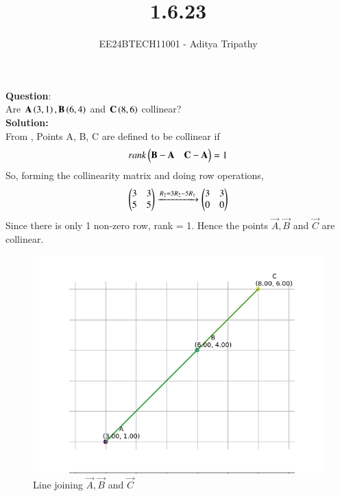 \documentclass[journal]{IEEEtran}
\begin{document}

\vspace{3cm}

\title{1.6.23}
\author{EE24BTECH11001 - Aditya Tripathy
}
 \maketitle
{\let\newpage\relax\maketitle}

\renewcommand{\thefigure}{\theenumi}
\renewcommand{\thetable}{\theenumi}
\setlength{\intextsep}{10pt} %


\renewcommand{\thetable}{\theenumi}


\textbf{Question}:\\
Are $\mathbf{A}\left(3, 1\right), \mathbf{B}\left(6, 4\right)$ and $\mathbf{C}\left(8, 6\right)$ collinear?
\\
\textbf{Solution: }\\
From , Points A, B, C are defined to be collinear if
\begin{align}
	rank\begin{pmatrix}\mathbf{B}-\mathbf{A} & \mathbf{C}-\mathbf{A}\end{pmatrix} = 1\\
\end{align}
So, forming the collinearity matrix and doing row operations,
\begin{align}
	\begin{pmatrix}3&3\\5&5\end{pmatrix} \xrightarrow{R_2 = 3R_2-5R_1}  \begin{pmatrix}3&3\\0&0\end{pmatrix}\\
\end{align}
Since there is only 1 non-zero row, rank = 1. Hence the points $\vec{A}, \vec{B}$ and $\vec{C}$ are collinear.
\begin{figure}[h!]
   \centering
   \includegraphics[width=0.7\linewidth]{figs/fig.png}
   \caption{Line joining $\vec{A}, \vec{B}$ and $\vec{C}$}
\end{figure}
\end{document}
